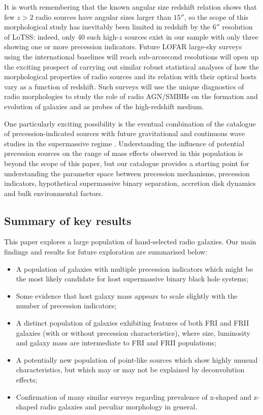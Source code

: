 \documentclass{aa}
\begin{document}
It is worth remembering that the known angular size redshift relation shows that few $z>2$ radio sources have angular sizes larger than $15''$, so the scope of this morphological study has inevitably been limited in redshift by the $6''$ resolution of LoTSS: indeed, only 40 such high-$z$ sources exist in our sample with only three showing one or more precession indicators. Future LOFAR large-sky surveys using the international baselines will reach sub-arcsecond resolutions will open up the exciting prospect of carrying out similar robust statistical analyses of how the morphological properties of radio sources and its relation with their optical hosts vary as a function of redshift. Such surveys will use the unique diagnostics of radio morphologies to study the role of radio AGN/SMBHs on the formation and evolution of galaxies and as probes of the high-redshift medium.

One particularly exciting possibility is the eventual combination of the catalogue of precession-indicated sources with future gravitational and continuous wave studies in the supermassive regime \citep[e.g.,][]{mingarelli25,steinle24,buonanno14}. Understanding the influence of potential precession sources on the range of mass effects observed in this population is beyond the scope of this paper, but our catalogue provides a starting point for understanding the parameter space between precession mechanisms, precession indicators, hypothetical supermassive binary separation, accretion disk dynamics and bulk environmental factors.

\subsection{Summary of key results}
This paper explores a large population of hand-selected radio galaxies. Our main findings and results for future exploration are summarised below:

\begin{itemize}
    \item A population of galaxies with multiple precession indicators which might be the most likely candidate for host supermassive binary black hole systems;
    \item Some evidence that host galaxy mass appears to scale slightly with the number of precession indicators;
    \item A distinct population of galaxies exhibiting features of both FRI and FRII galaxies (with or without precession characteristics), where size, luminosity and galaxy mass are intermediate to FRI and FRII populations;
    \item A potentially new population of point-like sources which show highly unusual characteristics, but which may or may not be explained by deconvolution effects;
    \item Confirmation of many similar surveys regarding prevalence of x-shaped and z-shaped radio galaxies and peculiar morphology in general.
\end{itemize}
\end{document}
